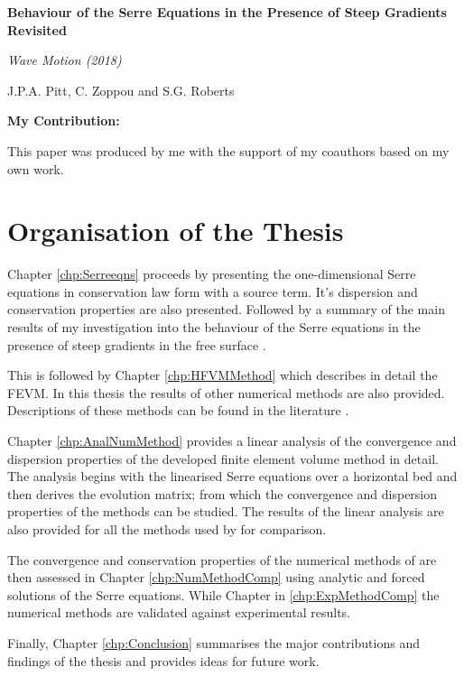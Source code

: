  \begin{center}
 	\textbf{
 		\Large Behaviour of the Serre Equations in the Presence of Steep Gradients Revisited}
 	
 	\vspace*{\baselineskip}
 	
 	\textit{Wave Motion (2018)}
 	
 	{J.P.A. Pitt, C. Zoppou and S.G. Roberts}
 	\vspace*{0.5\baselineskip}
 \end{center}
 \textbf{My Contribution:}
 
 This paper was produced by me with the support of my coauthors based on my own work.

\section{Organisation of the Thesis}
Chapter \ref{chp:Serreeqns} proceeds by presenting the one-dimensional Serre equations in conservation law form with a source term. It's dispersion and conservation properties are also presented. Followed by a summary of the main results of my investigation into the behaviour of the Serre equations in the presence of steep gradients in the free surface \cite{Pitt-2018-61}.

This is followed by Chapter \ref{chp:HFVMMethod} which describes in detail the FEVM. In this thesis the results of other numerical methods are also provided. Descriptions of these methods can be found in the literature \cite{Zoppou-etal-2017,Pitt-2018-61}. 

Chapter \ref{chp:AnalNumMethod} provides a linear analysis of the convergence and dispersion properties of the developed finite element volume method in detail. The analysis begins with the linearised Serre equations over a horizontal bed and then derives the evolution matrix; from which the convergence and dispersion properties of the methods can be studied. The results of the linear analysis are also provided for all the methods used by \citet{Pitt-2018-61} for comparison.

The convergence and conservation properties of the numerical methods of \citet{Pitt-2018-61} are then assessed in Chapter \ref{chp:NumMethodComp} using analytic and forced solutions of the Serre equations. While Chapter in \ref{chp:ExpMethodComp} the numerical methods are validated against experimental results.

Finally, Chapter \ref{chp:Conclusion} summarises the major contributions and findings of the thesis and provides ideas for future work. 